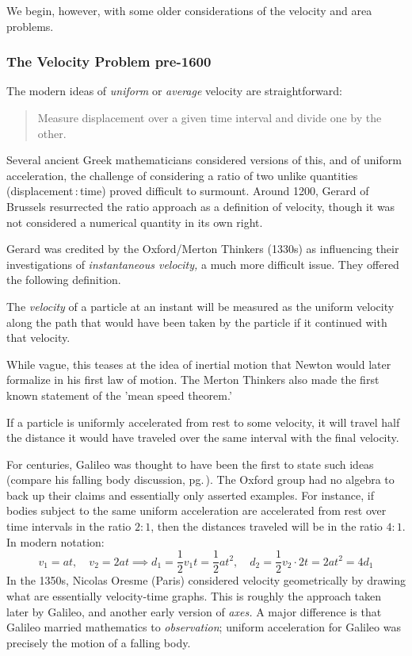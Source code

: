 We begin, however, with some older considerations of the velocity and area problems.


\subsubsection*{The Velocity Problem pre-1600}

The modern ideas of \emph{uniform} or \emph{average} velocity are straightforward:
\begin{quote}
	Measure displacement over a given time interval and divide one by the other.
\end{quote}
Several ancient Greek mathematicians %
considered versions of this, and of uniform acceleration, the challenge of considering a ratio of two unlike quantities (displacement\,:\,time) proved difficult to surmount. Around 1200, Gerard of Brussels resurrected the ratio approach as a definition of velocity, though it was not considered a numerical quantity in its own right.
\smallbreak

Gerard was credited by the Oxford/Merton Thinkers %
(1330s) as influencing their investigations of \emph{instantaneous velocity,} a much more difficult issue. They offered the following definition.

\begin{defn*}{}{}
	The \emph{velocity} of a particle at an instant will be measured as the uniform velocity along the path that would have been taken by the particle if it continued with that velocity.
\end{defn*}

While vague, this teases at the idea of inertial motion that Newton would later formalize in his first law of motion. The Merton Thinkers also made the first known statement of the 'mean speed theorem.'

\begin{thm*}{}{}
	If a particle is uniformly accelerated from rest to some velocity, it will travel half the distance it would have traveled over the same interval with the final velocity.
\end{thm*}

For centuries, Galileo was thought to have been the first to state such ideas (compare his falling body discussion, pg.\,\pageref{pg:galileo}). The Oxford group had no algebra to back up their claims and essentially only asserted examples. For instance, if bodies subject to the same uniform acceleration are accelerated from rest over time intervals in the ratio $2:1$, then the distances traveled will be in the ratio $4:1$. In modern notation:
\[
	v_1=at,\quad v_2=2at\implies d_1=\frac 12v_1t=\frac 12at^2,\quad d_2=\frac 12v_2\cdot 2t=2at^2=4d_1
\]
In the 1350s, Nicolas Oresme (Paris) considered velocity geometrically by drawing what are essentially velocity-time graphs. This is roughly the approach taken later by Galileo, and another early version of \emph{axes.} A major difference is that Galileo married mathematics to \emph{observation}; uniform acceleration for Galileo was precisely the motion of a falling body.
\smallbreak


